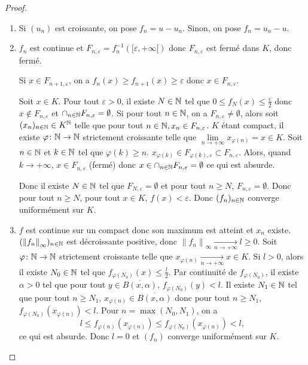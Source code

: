 \documentclass[12pt]{article}
\begin{document}
\begin{proof}
    \phantom{}
    \begin{enumerate}
        \item Si $(u_n)$ est croissante, on pose $f_n=u-u_n$. Sinon, on pose $f_n=u_n-u$.
        \item $f_n$ est continue et $F_{n,\varepsilon}=f_{n}^{-1}\left([\varepsilon,+\infty[\right)$ donc $F_{n,\varepsilon}$ est fermé dans $K$, donc fermé. 
        
        Si $x\in F_{n+1,\varepsilon}$, on a $f_n(x)\geqslant f_{n+1}(x)\geqslant\varepsilon$ donc $x\in F_{n,\varepsilon}$. 
        
        Soit $x\in K$. Pour tout $\varepsilon>0$, il existe $N\in\mathbb{N}$ tel que $0\leqslant f_{N}(x)\leqslant\frac{\varepsilon}{2}$ donc $x\notin F_{n,\varepsilon}$ et $\cap_{n\in\mathbb{N}}F_{n,\varepsilon}=\emptyset$. Si pour tout $n\in\mathbb{N}$, on a $F_{n,\varepsilon}\neq\emptyset$, alors soit $(x_n)_{n\in\mathbb{N}}\in K^{\mathbb{N}}$ telle que pour tout $n\in\mathbb{N},x_n\in F_{n,\varepsilon}$. $K$ étant compact, il existe $\varphi\colon\mathbb{N}\to\mathbb{N}$ strictement croissante telle que $\lim\limits_{n\to+\infty}x_{\varphi(n)}=x\in K$. Soit $n\in\mathbb{N}$ et $k\in\mathbb{N}$ tel que $\varphi(k)\geqslant n$. $x_{\varphi(k)}\in F_{\varphi(k),\varepsilon}\subset F_{n,\varepsilon}$. Alors, quand $k\to+\infty$, $x\in F_{n,\varepsilon}$ (fermé) donc $x\in\cap_{n\in\mathbb{N}}F_{n,\varepsilon}=\emptyset$ ce qui est absurde.

        Donc il existe $N\in\mathbb{N}$ tel que $F_{N,\varepsilon}=\emptyset$ et pour tout $n\geqslant N$, $F_{n,\varepsilon}=\emptyset$. Donc pour tout $n\geqslant N$, pour tout $x\in K$, $f(x)<\varepsilon$. Donc $(f_n)_{n\in\mathbb{N}}$ converge uniformément sur $K$.

        \item $f$ est continue sur un compact donc son maximum est atteint et $x_{n}$ existe. $(\left\lVert f_n\right\rVert_{\infty})_{n\in\mathbb{N}}$ est décroissante positive, donc $\left\lVert f_n\right\rVert_{\infty}\xrightarrow[n\to+\infty]{}l\geqslant0$. Soit $\varphi\colon\mathbb{N}\to\mathbb{N}$ strictement croissante telle que $x_{\varphi(n)}\xrightarrow[n\to+\infty]{}x\in K$. Si $l>0$, alors il existe $N_{0}\in\mathbb{N}$ tel que $f_{\varphi(N_0)}(x)\leqslant\frac{l}{2}$. Par continuité de $f_{\varphi(N_0)}$, il existe $\alpha>0$ tel que pour tout $y\in\overline{B(x,\alpha)}$, $f_{\varphi(N_0)}(y)<l$. Il existe $N_{1}\in\mathbb{N}$ tel que pour tout $n\geqslant N_{1}$, $x_{\varphi(n)}\in\overline{B(x,\alpha)}$ donc pour tout $n\geqslant N_{1}$, $f_{\varphi(N_0)}(x_{\varphi(n)})<l$. Pour $n=\max(N_0,N_1)$, on a 
        \begin{equation}
            l\leqslant f_{\varphi(n)}(x_{\varphi(n)})\leqslant f_{\varphi(N_{0})}(x_{\varphi(n)})<l,
        \end{equation}
        ce qui est absurde. Donc $l=0$ et $(f_n)$ converge uniformément sur $K$.
    \end{enumerate}
\end{proof}
\end{document}
